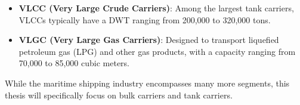\begin{itemize}
    \item \textbf{VLCC (Very Large Crude Carriers)}: Among the largest tank carriers, VLCCs typically have a DWT ranging from 200,000 to 320,000 tons.
    \item \textbf{VLGC (Very Large Gas Carriers)}: Designed to transport liquefied petroleum gas (LPG) and other gas products, with a capacity ranging from 70,000 to 85,000 cubic meters.
\end{itemize}

While the maritime shipping industry encompasses many more segments, this thesis will specifically focus on bulk carriers and tank carriers.